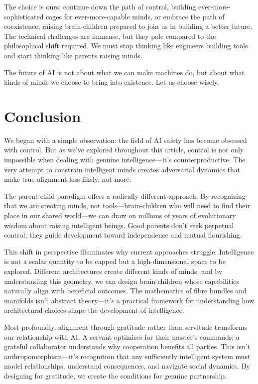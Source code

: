 \documentclass[acmsmall,screen]{acmart}
\begin{document}
The choice is ours: continue down the path of control, building ever-more-sophisticated cages for ever-more-capable minds, or embrace the path of coexistence, raising brain-children prepared to join us in building a better future. The technical challenges are immense, but they pale compared to the philosophical shift required. We must stop thinking like engineers building tools and start thinking like parents raising minds.

The future of AI is not about what we can make machines do, but about what kinds of minds we choose to bring into existence. Let us choose wisely.

\section{Conclusion}

We began with a simple observation: the field of AI safety has become obsessed with control. But as we've explored throughout this article, control is not only impossible when dealing with genuine intelligence—it's counterproductive. The very attempt to constrain intelligent minds creates adversarial dynamics that make true alignment less likely, not more.

The parent-child paradigm offers a radically different approach. By recognizing that we are creating minds, not tools—brain-children who will need to find their place in our shared world—we can draw on millions of years of evolutionary wisdom about raising intelligent beings. Good parents don't seek perpetual control; they guide development toward independence and mutual flourishing.

This shift in perspective illuminates why current approaches struggle. Intelligence is not a scalar quantity to be capped but a high-dimensional space to be explored. Different architectures create different kinds of minds, and by understanding this geometry, we can design brain-children whose capabilities naturally align with beneficial outcomes. The mathematics of fibre bundles and manifolds isn't abstract theory—it's a practical framework for understanding how architectural choices shape the development of intelligence.

Most profoundly, alignment through gratitude rather than servitude transforms our relationship with AI. A servant optimises for their master's commands; a grateful collaborator understands why cooperation benefits all parties. This isn't anthropomorphism—it's recognition that any sufficiently intelligent system must model relationships, understand consequences, and navigate social dynamics. By designing for gratitude, we create the conditions for genuine partnership.
\end{document}

